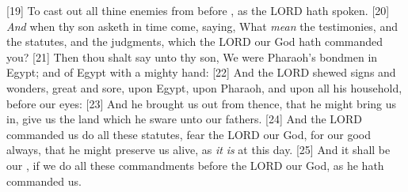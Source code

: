 [19] \textcolor[cmyk]{0.99998,1,0,0}{To cast out all thine enemies from before  , as the LORD hath spoken.}
[20] \textcolor[cmyk]{0.99998,1,0,0}{\emph{And} when thy son asketh   in time  come, saying, What \emph{mean} the testimonies, and the statutes, and the judgments, which the LORD our God hath commanded you?}
[21] \textcolor[cmyk]{0.99998,1,0,0}{Then thou shalt say unto thy son, We were Pharaoh's bondmen in Egypt; and  of Egypt with a mighty hand:}
[22] \textcolor[cmyk]{0.99998,1,0,0}{And the LORD shewed signs and wonders, great and sore, upon Egypt, upon Pharaoh, and upon all his household, before our eyes:}
[23] \textcolor[cmyk]{0.99998,1,0,0}{And he brought us out from thence, that he might bring us in,  give us the land which he sware unto our fathers.}
[24] \textcolor[cmyk]{0.99998,1,0,0}{And the LORD commanded us  do all these statutes,  fear the LORD our God, for our good always, that he might preserve us alive, as \emph{it} \emph{is} at this day.}
[25] \textcolor[cmyk]{0.99998,1,0,0}{And it shall be our , if we   do all these commandments before the LORD our God, as he hath commanded us.}
